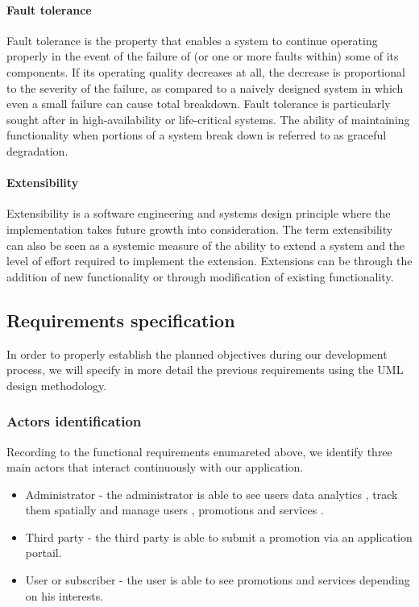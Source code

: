 \paragraph{Fault tolerance}
\label{sec:sec01}
Fault tolerance is the property that enables a system to continue operating properly in the event of the failure 
of (or one or more faults within) some of its components. If its operating quality decreases at all, the decrease
 is proportional to the severity of the failure, as compared to a naively designed system in which even a small 
 failure can cause total breakdown. Fault tolerance is particularly sought after in high-availability or life-critical
  systems. The ability of maintaining functionality when portions of a system break down is referred to as graceful 
  degradation.

 \paragraph{Extensibility}
\label{sec:sec01}
Extensibility is a software engineering and systems design principle where the implementation takes 
future growth into consideration. The term extensibility can also be seen as a systemic measure of the 
ability to extend a system and the level of effort required to implement the extension. Extensions can be through 
the addition of new functionality or through modification of existing functionality.

\subsection{Requirements specification}
\label{sec:sec01}
In order to properly establish the planned objectives during our development process, we will specify in more detail
the previous requirements using the UML design methodology.
\subsubsection{Actors identification}
\label{sec:sec01}
Recording to the functional requirements enumareted above, we identify three main actors that interact continuously with our application.
\begin{itemize}
  \item Administrator - the administrator is able to see users data analytics , track them spatially and manage users
   , promotions and services .
  \item Third party - the third party is able to submit a promotion via an application portail.
  \item User or subscriber - the user is able to see promotions and services depending on his interests.
\end{itemize}

